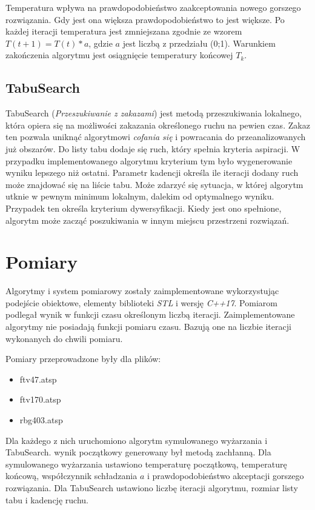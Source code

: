 \documentclass[12pt]{article}
\begin{document}
Temperatura wpływa na prawdopodobieństwo zaakceptowania nowego gorszego rozwiązania. Gdy jest ona większa prawdopodobieństwo to jest większe. Po każdej iteracji temperatura jest zmniejszana zgodnie ze wzorem $T(t+1)=T(t)*a$, gdzie $a$ jest liczbą z przedziału (0;1). Warunkiem zakończenia algorytmu jest osiągnięcie temperatury końcowej $T_k$.

\subsection{TabuSearch}
TabuSearch (\textit{Przeszukiwanie z zakazami}) jest metodą przeszukiwania lokalnego, która opiera się na możliwości zakazania określonego ruchu na pewien czas.
Zakaz ten pozwala uniknąć algorytmowi \textit{cofania się} i powracania do przeanalizowanych już obszarów.
Do listy tabu dodaje się ruch, który spełnia kryteria aspiracji. W przypadku implementowanego algorytmu kryterium tym było wygenerowanie wyniku lepszego niż ostatni. Parametr kadencji określa ile iteracji dodany ruch może znajdować się na liście tabu.
Może zdarzyć się sytuacja, w której algorytm utknie w pewnym minimum lokalnym, dalekim od optymalnego wyniku. Przypadek ten określa kryterium dywersyfikacji. Kiedy jest ono spełnione, algorytm może zacząć poszukiwania w innym miejscu przestrzeni rozwiązań.


\section{Pomiary}
Algorytmy i system pomiarowy zostały zaimplementowane wykorzystując podejście obiektowe, elementy biblioteki \textit{STL} i wersję \textit{C++17}.
Pomiarom podlegał wynik w funkcji czasu określonym liczbą iteracji. Zaimplementowane algorytmy nie posiadają funkcji pomiaru czasu. Bazują one na liczbie iteracji wykonanych do chwili pomiaru.

Pomiary przeprowadzone były dla plików:
\begin{itemize}[noitemsep]
    \item ftv47.atsp
    \item ftv170.atsp
    \item rbg403.atsp
\end{itemize}
Dla każdego z nich uruchomiono algorytm symulowanego wyżarzania i TabuSearch. wynik początkowy generowany był metodą zachłanną.
Dla symulowanego wyżarzania ustawiono temperaturę początkową, temperaturę końcową, współczynnik schładzania $a$ i prawdopodobieństwo akceptacji gorszego rozwiązania.
Dla TabuSearch ustawiono liczbę iteracji algorytmu, rozmiar listy tabu i kadencję ruchu.
\clearpage
\end{document}
